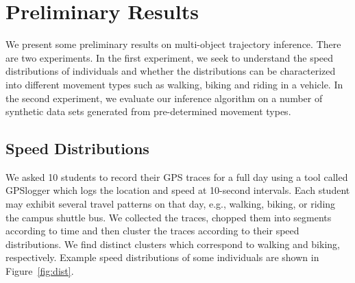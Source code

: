 \section{Preliminary Results}
We present some preliminary results on multi-object trajectory inference.
There are two experiments. In the first experiment, we seek to understand
the speed distributions of individuals and whether the distributions can be
characterized into different movement types such as walking, biking and
riding in a vehicle. In the second experiment, we evaluate our inference
algorithm on a number of synthetic data sets generated from pre-determined
movement types.

\subsection{Speed Distributions}
We asked 10 students to record their GPS traces for a full day
using a tool called GPSlogger which logs the location and speed 
at 10-second intervals. Each student may exhibit several travel patterns
on that day, e.g., walking, biking, or riding the campus shuttle bus.
We collected the traces, chopped them into segments according to time and then
cluster the traces according to their speed distributions. We find distinct
clusters which correspond to walking and biking, respectively. 
Example speed distributions of some individuals are shown 
in Figure~\ref{fig:dist}. 

